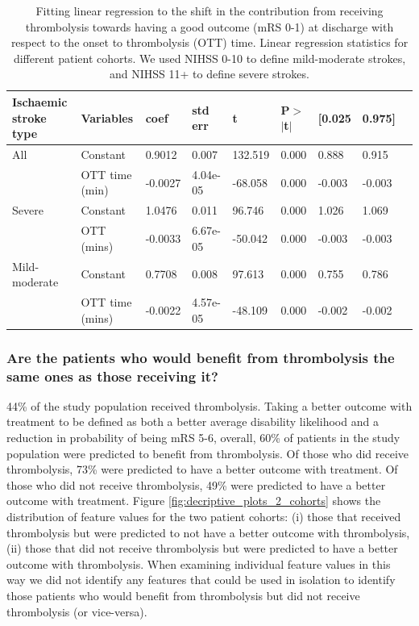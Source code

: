 \newpage
\begin{table}[H]
    \caption{Fitting linear regression to the shift in the contribution from receiving thrombolysis towards having a good outcome (mRS 0-1) at discharge with respect to the onset to thrombolysis (OTT) time. Linear regression statistics for different patient cohorts. We used NIHSS 0-10 to define mild-moderate strokes, and NIHSS 11+ to define severe strokes.}
    \centering
        \begin{tabular}{lllllllll}
        \toprule
         Ischaemic stroke type & Variables & coef & std err & t & P$>$$|$t$|$ & [0.025 & 0.975] \\ 
         \midrule
        All & Constant & 0.9012 & 0.007 & 132.519 & 0.000 & 0.888 & 0.915\\
        & OTT time (min) &  -0.0027  & 4.04e-05 & -68.058 & 0.000 & -0.003 & -0.003\\   
        \midrule
        Severe & Constant & 1.0476  &    0.011  & 96.746 & 0.000 & 1.026 & 1.069\\
        & OTT (mins) & -0.0033 &  6.67e-05  & -50.042 & 0.000 & -0.003 & -0.003\\ 
        \midrule
        Mild-moderate & Constant &           0.7708 &     0.008   & 97.613 & 0.000 & 0.755 & 0.786\\
        & OTT time (mins) &  -0.0022 &   4.57e-05 & -48.109 & 0.000 & -0.002 & -0.002\\
        \bottomrule
        \end{tabular}
      \label{fig:stats_table_mrs1}
\end{table}


\subsubsection{Are the patients who would benefit from thrombolysis the same ones as those receiving it? \cite{pearn_are_2024}}

44\% of the study population received thrombolysis. Taking a better outcome with treatment to be defined as both a better average disability likelihood and a reduction in probability of being mRS 5-6, overall, 60\% of patients in the study population were predicted to benefit from thrombolysis. Of those who did receive thrombolysis, 73\% were predicted to have a better outcome with treatment. Of those who did not receive thrombolysis, 49\% were predicted to have a better outcome with treatment. Figure \ref{fig:decriptive_plots_2_cohorts} shows the distribution of feature values for the two patient cohorts: (i) those that received thrombolysis but were predicted to not have a better outcome with thrombolysis, (ii) those that did not receive thrombolysis but were predicted to have a better outcome with thrombolysis. When examining individual feature values in this way we did not identify any features that could be used in isolation to identify those patients who would benefit from thrombolysis but did not receive thrombolysis (or vice-versa).

